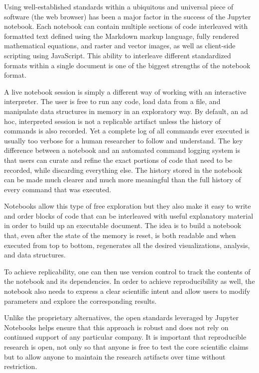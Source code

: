 \documentclass[phd,ianc,twoside]{infthesis}
\begin{document}
Using well-established standards within a ubiquitous and
universal piece of software (the web browser) has been a major
factor in the success of the Jupyter notebook. Each notebook can contain
multiple sections of code interleaved with formatted text defined using
the Markdown markup language, fully rendered mathematical equations, and
raster and vector images, as well as client-side scripting using
JavaScript. This ability to interleave different standardized formats
within a single document is one of the biggest strengths of the notebook
format.

A live notebook session is simply a different way of working with an
interactive interpreter. The user is free to run any code, load data
from a file, and manipulate data structures in memory in an exploratory
way. By default, an ad hoc, interpreted session is not a replicable
artifact unless the history of commands is also recorded. Yet a
complete log of all commands ever executed is usually too verbose for
a human researcher to follow and understand.  The key difference
between a notebook and an automated command logging system is that users
can curate and refine the exact portions of code that need to be
recorded, while discarding everything else. The history stored in the
notebook can be made much clearer and much more meaningful than the full
history of every command that was executed.

Notebooks allow this type of free exploration but they also make it easy
to write and order blocks of code that can be interleaved with useful
explanatory material in order to build up an executable document.  The
idea is to build a notebook that, even after the state of the memory
is reset, is both readable and when executed from top to bottom,
regenerates all the desired visualizations, analysis, and data
structures. 

To achieve replicability, one can then use version control to track
the contents of the notebook and its dependencies. In order to achieve
reproducibility as well, the notebook also needs to express a clear
scientific intent and allow users to modify parameters and explore the
corresponding results.

Unlike the proprietary alternatives, the open
standards leveraged by Jupyter Notebooks helps ensure that this approach
is robust and does not rely on continued support of any particular
company. It is important that reproducible research is open, not only so
that anyone is free to test the core scientific claims but to allow
anyone to maintain the research artifacts over time without restriction.
\end{document}
